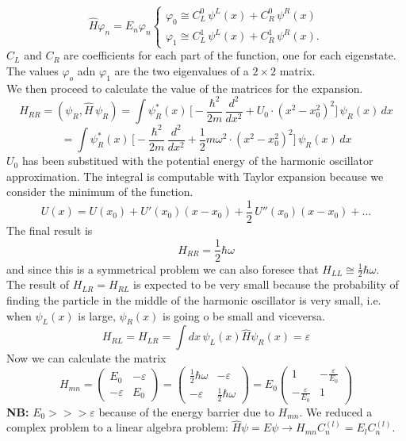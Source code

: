 \[
\hat{H}\varphi_n=E_n\varphi_n
\begin{cases}
\varphi_0 \cong C_L^0\,\psi^L(x)+C_R^0\,\psi^R(x)\\
\varphi_1 \cong C_L^1\,\psi^L(x)+C_R^1\,\psi^R(x).
\end{cases}
\]
$C_L$ and $C_R$ are coefficients for each part of the function, one for each eigenstate. The values $\varphi_o$ adn $\varphi_1$ are the two eigenvalues of a $2 \times 2 $ matrix.\\
We then proceed to calculate the value of the matrices for the expansion.\\
\[
H_{RR}=(\psi_R,\hat{H}\,\psi_R)= \int\psi_R^*(x)\,\bigg[-\frac{\hbar^2}{2m}\,\frac{d^2}{dx^2}+U_0\cdot(x^2-x_0^2)^2\bigg]\,\psi_R(x)\,dx\]
\[
=\int\psi_R^*(x)\,\bigg[-\frac{\hbar^2}{2m}\,\frac{d^2}{dx^2}+\frac{1}{2}m\omega^2\cdot(x^2-x_0^2)^2\bigg]\,\psi_R(x)\,dx
\]
$U_0$ has been substitued with the potential energy of the harmonic oscillator approximation. The integral is computable with Taylor expansion because we consider the minimum of the function.
\[
U(x)=U(x_0)+U'(x_0)(x-x_0)+\frac{1}{2}\,U''(x_0)(x-x_0)+\dots\]
The final result is
\[
H_{RR}=\frac{1}{2}\hbar\omega
\]
and since this is a symmetrical problem we can also foresee that $H_{LL}\cong\frac{1}{2}\hbar\omega$.\\
The result of $H_{LR}=H_{RL}$ is expected to be very small because the probability of finding the particle in the middle of the harmonic oscillator is very small, i.e. when $\psi_L(x)$ is large, $\psi_R(x)$ is going o be small and viceversa.
\[
H_{RL}=H_{LR}=\int dx\,\psi_L(x)\hat{H}\psi_R(x) = \varepsilon
\]
Now we can calculate the matrix
\[
H_{mn}=
\begin{pmatrix}
E_0 & -\varepsilon\\
-\varepsilon & E_0
\end{pmatrix}
=
\begin{pmatrix}
\frac{1}{2}\hbar\omega & -\varepsilon\\
-\varepsilon & \frac{1}{2}\hbar\omega
\end{pmatrix}
=
E_0
\begin{pmatrix}
1 & -\frac{\varepsilon}{E_0}\\
-\frac{\varepsilon}{E_0} & 1
\end{pmatrix}
\]
\textbf{NB:} $E_0>>>\varepsilon$ because of the energy barrier due to $H_{mn}$.
\newline
We reduced a complex problem to a linear algebra problem: $\hat{H}\psi=E\psi \rightarrow H_{mn}C_n^{(l)}=E_lC_n^{(l)}$.\\
